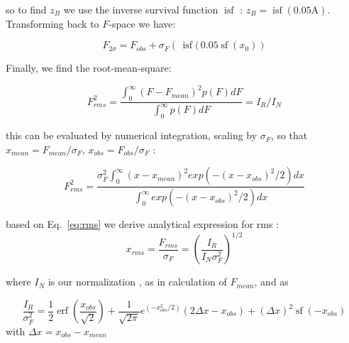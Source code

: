 \documentclass[fleqn,usenatbib]{mnras}  %
\DeclareMathOperator\erf{erf}
\DeclareMathOperator\sf{sf}
\DeclareMathOperator\isf{isf}
\begin{document}
so to find  $z_{B}$ we use the  inverse survival function $\isf$ : $z_{B} = \isf(0.05 \text{A})$. Transforming back to $F$-space we have:

\begin{equation}
F_{2\sigma} = F_{obs} + \sigma_{F} \left(\, \isf (\, 0.05 \sf (x_{0})  \right)
\end{equation}

\bigskip

Finally, we find the root-mean-square:

\begin{equation}
\label{eq:rms}
F_{rms}^{2} = \frac{\int _{0} ^ {\infty}{(F-F_{mean})^{2} p(F) dF}}{\int _{0} ^ {\infty}{p(F) dF}} = I_{R} / I_{N}
\end{equation}

this can be evaluated by numerical integration, scaling by $\sigma_{F}$, so that $x_{mean} = F_{mean} / \sigma_{F}$, $x_{obs} = F_{obs} / \sigma_{F}$ : 

\begin{equation}
F_{rms}^{2} = \frac{\sigma_{F}^{2} \int_{0}^{\infty} {(x-x_{mean})^{2} exp(-(x-x_{obs})^{2} / 2 ) dx }}  {\int_{0}^{\infty} {exp(-(x-x_{obs})^{2} / 2 ) dx }}
\end{equation}

based on  Eq.~\ref{eq:rms} we derive analytical expression for rms :
\begin{equation}
x_{rms} =  \frac{F_{rms}}{\sigma_{F}} =   \left(\frac{I_{R}}{I_{N} \sigma_{F}^{2}}\right)^{1/2}
\end{equation}

where $I_{N}$ is our normalization , as in calculation of $F_{mean}$, and as 


\begin{equation}
\frac{I_{R}}{ \sigma_{F}^{2}} = \frac{1}{2} \erf\left(\frac{x_{obs}}{\sqrt{2}}\right) + \frac{1}{\sqrt{2\pi}} e^{(-x_{obs}^{2} / 2)} (2 \Delta x - x_{obs}) + (\Delta x)^{2} \sf(-x_{obs})
\end{equation}
with  $\Delta x = x_{obs} - x_{mean}$










\bsp	%
\label{lastpage}
\end{document}
